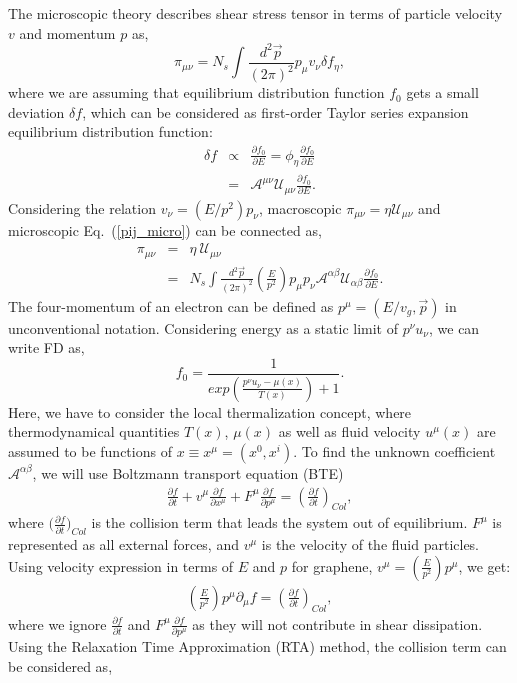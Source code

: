 \documentclass[%
 reprint,
 amsmath,amssymb,
 aps,
]{revtex4-2}
\newcommand{\be}{\begin{equation}}
\newcommand{\ee}{\end{equation}}
\newcommand{\bea}{\begin{eqnarray}}
\newcommand{\eea}{\end{eqnarray}}
\newcommand{\nn}{\nonumber}
\begin{document}
%
    The microscopic theory describes shear stress tensor in terms of particle velocity $v$ and momentum $p$ as,
%
    \be
    \pi_{\mu\nu}=N_s \int \frac{d^2 \vec{p}}{(2 \pi)^2} p_{\mu} v_{\nu} \delta f_\eta,
    \label{pij_micro}
    \ee
%
    where we are assuming that equilibrium distribution function $f_0$ gets a small deviation $\delta f$, which can be considered as first-order Taylor series expansion equilibrium distribution function:
%
    \bea 
    \delta f &\propto& \frac{\partial f_0}{\partial E}
    =\phi_\eta \frac{\partial f_0}{\partial E}
    \nn\\
    &=&\mathcal{A}^{\mu\nu} \mathcal{U}_{\mu\nu} \frac{\partial f_0}{\partial E}.
    \eea
%
    Considering the relation $v_{\nu}=(E/p^2) p_{\nu}$, macroscopic $\pi_{\mu\nu}=\eta \mathcal{U}_{\mu\nu}$ and microscopic Eq.~(\ref{pij_micro}) can be connected as, 
%
    \bea
    	\pi_{\mu\nu} &=& \eta ~\mathcal{U}_{\mu\nu}\nn\\
    	&=& N_s \int \frac{d^2 \vec{p}}{(2 \pi)^2} \left(\frac{E}{p^2}\right)p_{\mu} p_{\nu} \mathcal{A}^{\alpha\beta} \mathcal{U}_{\alpha\beta} \frac{\partial f_0}{\partial E}.
    \eea
%
    The four-momentum of an electron can be defined as $p^\mu=(E/v_g, \vec{p})$ in unconventional notation.
%
    Considering energy as a static limit of $p^\nu u_\nu$, we can write FD as,
%
    \be
    f_0=\frac{1}{exp{\left( \frac{p^\nu u_\nu - \mu(x)}{T(x)}\right)+1}}.
    \label{a1}
    \ee
    Here, we have to consider the local thermalization concept, where thermodynamical quantities $T(x)$, $\mu(x)$ as well as fluid velocity $u^{\mu}(x)$ are assumed to be functions of $x \equiv x^{\mu}=(x^0, x^i)$.
%
    To find the unknown coefficient $\mathcal{A}^{\alpha\beta}$, we will use Boltzmann transport equation (BTE)
    \bea
    \frac{\partial f}{\partial t}+v^\mu \frac{\partial f}{\partial x^\mu}+F^\mu \frac{\partial f}{\partial p^\mu}=\left( \frac{\partial f}{\partial t}\right)_{Col},
    \eea
    where $\Big( \frac{\partial f}{\partial t}\Big)_{Col}$ is the collision term that leads the system out of equilibrium. $F^\mu $ is represented as all external forces, and $v^\mu$ is the velocity of the fluid particles.
%
    Using velocity expression in terms of $E$ and $p$ for graphene, $v^\mu=(\frac{E}{p^2})p^\mu$, we get:
%
    \bea
    \left(\frac{E}{p^2}\right)p^\mu \partial_\mu f=\left( \frac{\partial f}{\partial t}\right)_{Col},
    \eea
    where we ignore $\frac{\partial f}{\partial t}$ and $F^\mu \frac{\partial f}{\partial p^\mu}$ as they will not contribute in shear dissipation. Using the Relaxation Time Approximation (RTA) method, the collision term can be considered as,
\end{document}
